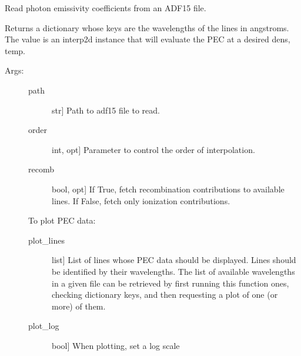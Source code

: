 \documentclass[letterpaper,10pt,english]{sphinxmanual}
\begin{document}
\begin{fulllineitems}
\label{\detokenize{aurora:aurora.atomic.read_adf15}}
Read photon emissivity coefficients from an ADF15 file.

Returns a dictionary whose keys are the wavelengths of the lines in
angstroms. The value is an interp2d instance that will evaluate the PEC at
a desired dens, temp.
\begin{description}
\item[{Args:}] \leavevmode\begin{description}
\item[{path}] \leavevmode{[}str{]}
Path to adf15 file to read.

\item[{order}] \leavevmode{[}int, opt{]}
Parameter to control the order of interpolation.

\item[{recomb}] \leavevmode{[}bool, opt{]}
If True, fetch recombination contributions to available lines. If False,
fetch only ionization contributions.

\end{description}

To plot PEC data:
\begin{description}
\item[{plot\_lines}] \leavevmode{[}list{]}
List of lines whose PEC data should be displayed. Lines should be identified
by their wavelengths. The list of available wavelengths in a given file can be retrieved
by first running this function ones, checking dictionary keys, and then requesting a
plot of one (or more) of them.

\item[{plot\_log}] \leavevmode{[}bool{]}
When plotting, set a log scale


\end{description}
\end{description}
\end{fulllineitems}
\end{document}
